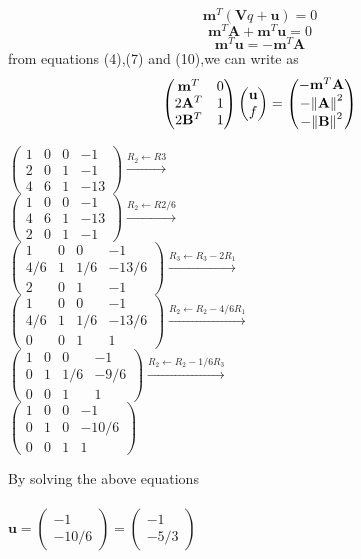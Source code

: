 \documentclass[10pt, a4paper]{article}
\newcommand{\myvec}[1]{\ensuremath{\begin{pmatrix}#1\end{pmatrix}}}
\let\vec\mathbf
\begin{document}
\begin{equation}
	\vec{m}^T (\vec{V}q + \vec{u}) = 0
\end{equation}
\begin{equation}
	\vec{m}^T\vec{A} +\vec{m}^T\vec{u} = 0
\end{equation}
\begin{equation}
	 \vec{m}^T\vec{u} = -\vec{m}^T\vec{A}
\end{equation}
from equations (4),(7) and (10),we can write as 
\begin{equation}
	\myvec{\vec{m}^T & 0 \\ 2\vec{A}^T & 1 \\ 2\vec{B}^T & 1}\myvec{\vec{u} \\ f} = \myvec{-\vec{m}^T\vec{A} \\ -\norm{\vec{A}}^2 \\ -\norm{\vec{B}}^2}
\end{equation}
\begin{center}
$\myvec{1&0&0&-1 \\2 & 0& 1 & -1 \\ 4 & 6 & 1 & -13 } \xrightarrow[]{R_2 \leftarrow R3 }$\\
$\myvec{1&0&0&-1 \\4 & 6 & 1 & -13 \\ 2 & 0 & 1 & -1 } \xrightarrow[]{R_2 \leftarrow R2 / 6 } $\\
$\myvec{1&0&0&-1 \\4/6 & 1 & 1/6 & -13/6 \\ 2 & 0 & 1 & -1 } \xrightarrow[]{R_3 \leftarrow  R_3-2R_1 }$\\
$\myvec{1&0&0&-1 \\4/6 & 1 & 1/6 & -13/6 \\ 0 & 0 & 1 & 1 } \xrightarrow[]{R_2 \leftarrow R_2- 4/6R_1 }$\\
$\myvec{1&0&0&-1 \\0 & 1 & 1/6 & -9/6 \\ 0 & 0 & 1 & 1 } \xrightarrow[]{R_2 \leftarrow R_2- 1/6R_3 }$\\
$\myvec{1&0&0&-1 \\0 & 1 & 0 & -10/6 \\ 0 & 0 & 1 & 1 }$\\
\end{center}
By solving the above equations\\\\ $\vec{u} =\myvec{-1 \\ -10/6}=\myvec{-1 \\ -5/3}$\\\\\\
\end{document}
